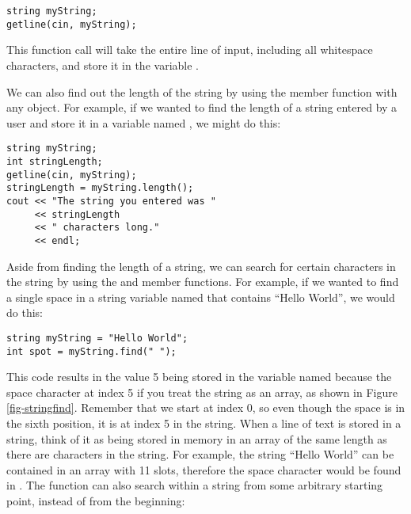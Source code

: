 \noindent\begin{minipage}{\textwidth}\begin{lstlisting}
string myString;
getline(cin, myString);
\end{lstlisting}\end{minipage}

\noindent This function call will take the entire line of input, including all whitespace characters, and store it in the variable . 
		
We can also find out the length of the string by using the member function  with any  object.
For example, if we wanted to find the length of a string entered by a user and store it in a variable named , we might do this:

\noindent\begin{minipage}{\textwidth}\begin{lstlisting}
string myString;
int stringLength;
getline(cin, myString);
stringLength = myString.length();
cout << "The string you entered was "
     << stringLength
     << " characters long."
     << endl;
\end{lstlisting}\end{minipage}

\noindent Aside from finding the length of a string, we can search for certain characters in the string by using the  and  member functions.
For example, if we wanted to find a single space in a string variable named  that contains ``Hello World'', we would do this:

\noindent\begin{minipage}{\textwidth}\begin{lstlisting}
string myString = "Hello World";
int spot = myString.find(" ");
\end{lstlisting}\end{minipage}

This code results in the value 5 being stored in the variable named  because the space character at index 5 if you treat the string as an array, as shown in Figure \ref{fig-stringfind}.
Remember that we start at index 0, so even though the space is in the sixth position, it is at index 5 in the string.
When a line of text is stored in a string, think of it as being stored in memory in an array of the same length as there are characters in the string.
For example, the string ``Hello World'' can be contained in an array with 11 slots, therefore the space character would be found in .
The  function can also search within a string from some arbitrary starting point, instead of from the beginning:

